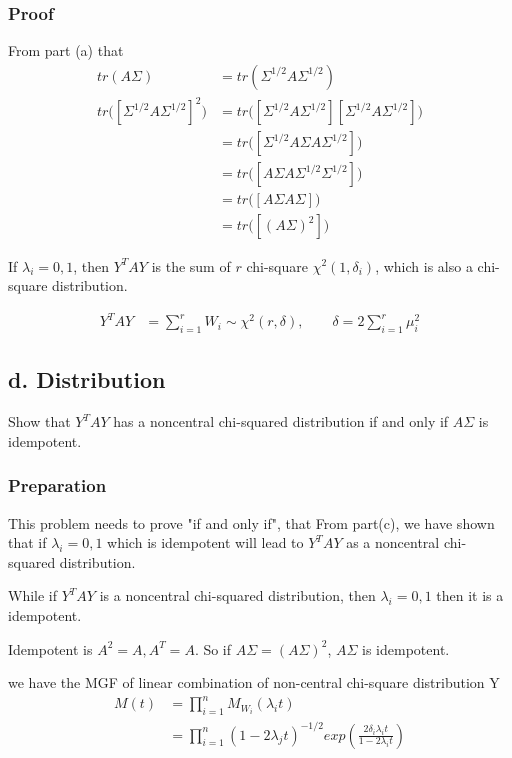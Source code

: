 \documentclass[11pt]{article} %
\begin{document}
\subsubsection{Proof}
From part (a) that 
\begin{align*}
	tr(A\Sigma) &= tr( \Sigma^{1/2} A \Sigma^{1/2} ) \\
	tr \Big( [\Sigma^{1/2} A \Sigma^{1/2}]^2 \Big) &= tr \Big( [\Sigma^{1/2} A \Sigma^{1/2}] [\Sigma^{1/2} A \Sigma^{1/2}] \Big) \\
	&= tr \Big( [\Sigma^{1/2} A \Sigma A \Sigma^{1/2}] \Big) \\
	&= tr \Big( [ A \Sigma A \Sigma^{1/2} \Sigma^{1/2}] \Big) \\
	&= tr \Big( [ A \Sigma A \Sigma] \Big) \\
	&= tr \Big( [ (A \Sigma)^2 ] \Big) 
\end{align*}


If $\lambda_i = 0, 1$, then $Y^T A Y$ is the sum of $r$ chi-square $\chi^2(1, \delta_i)$, which is also a chi-square distribution.

\begin{align*}
	Y^T A Y &= \sum_{i=1}^r W_i \sim \chi^2 (r, \delta), \qquad \delta = 2 \sum_{i=1}^r \mu_i^2
\end{align*}



\subsection{d. Distribution}
Show that $Y^T A Y$ has a noncentral chi-squared distribution if and only if $A \Sigma$ is idempotent.

\subsubsection{Preparation}
This problem needs to prove "if and only if", that From part(c), we have shown that if $\lambda_i = 0,1$ which is idempotent will lead to $Y^T A Y$ as a noncentral chi-squared distribution. 

While if $Y^T A Y$ is a noncentral chi-squared distribution, then $\lambda_i = 0, 1$ then it is a idempotent. 

Idempotent is $A^2 = A, A^T = A$. So if $A \Sigma = (A \Sigma)^2$, $A \Sigma$ is idempotent. 

we have the MGF of linear combination of non-central chi-square distribution Y
\begin{align*}
	M(t) &= \prod_{i=1}^n M_{W_i}(\lambda_i t)\\
	&=\prod_{i=1}^n  (1-2 \lambda_j t)^{-1/2} exp \left( \frac{ 2 \delta_i \lambda_i t }{1-2 \lambda_i t} \right)
\end{align*}
\end{document}

